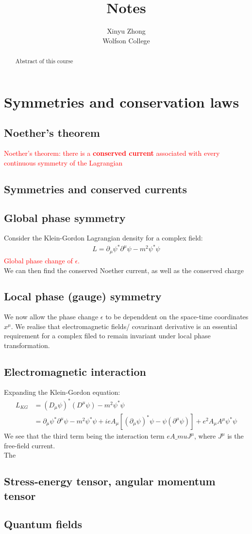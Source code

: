 \documentclass[12pt,a4paper]{article}
\author{Xinyu Zhong\\Wolfson College}
\title{Notes}
\newcommand{\definition}[1]{\textcolor{red}{#1}{}}
\newcommand{\theorem}[1]{\textcolor{red}{#1}{}}
\begin{document}
\begin{titlepage}
    \maketitle
\end{titlepage}

\tableofcontents

\newpage

\begin{abstract}
\noindent
Abstract of this course
\end{abstract}


\section{Symmetries and conservation laws}
    \subsection{Noether's theorem}
    \theorem{Noether's theorem: there is a \textbf{conserved current} associated with every continuous symmetry of the Lagrangian}
    \subsection{Symmetries and conserved currents}
    \subsection{Global phase symmetry}
    Consider the Klein-Gordon Lagrangian density for a complex field:
    \begin{align*}
        L=\partial_\mu\psi^*\partial^\mu\psi-m^2\psi^*\psi
    \end{align*}
    \definition{Global phase change of $\epsilon$.}\\
    We can then find the conserved Noether current, as well as the conserved charge 

    \subsection{Local phase (gauge) symmetry}
    We now allow the phase change $\epsilon$ to be dependdent on the space-time coordinates $x^\mu$. 
    We realise that electromagnetic fields/ covarinant derivative is an essential requirement for a complex filed to remain invariant under local phase transformation.
    \subsection{Electromagnetic interaction}
    Expanding the Klein-Gordon equation:
    \begin{align*}
        L_{KG}&=(D_\mu\psi)^*(D^\mu\psi) - m^2\psi^*\psi\\
        &= \partial_\mu\psi^*\partial^\mu\psi-m^2\psi^*\psi+ieA_\mu[(\partial_\mu\psi)^*\psi-\psi(\partial^\mu\psi)]+e^2A_{\mu}A^\mu\psi^*\psi
    \end{align*}
    We see that the third term being the interaction term $eA\_muJ^\mu$, where $J^\mu$ is the free-field current.\\
    The
    \subsection{Stress-energy tensor, angular momentum tensor}
    \subsection{Quantum fields}
\end{document}

